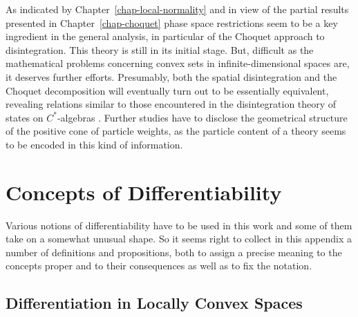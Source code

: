 \documentclass[11pt,twoside,openright]{report}
\theoremstyle{definition}
\theoremstyle{plain}
\theoremstyle{remark}
\theoremstyle{assumption}
\begin{document}
As indicated by Chapter~\ref{chap-local-normality} and in view of the
partial results presented in Chapter~\ref{chap-choquet} phase space
restrictions seem to be a key ingredient in the general analysis, in
particular of the Choquet approach to disintegration. This theory is
still in its initial stage. But, difficult as the mathematical
problems concerning convex sets in infinite-dimensional spaces are, it
deserves further efforts. Presumably, both the spatial disintegration
and the Choquet decomposition will eventually turn out to be
essentially equivalent, revealing relations similar to those
encountered in the disintegration theory of states on
$C^*$-algebras \cite[Chapter~4]{bratteli/robinson:1987}. Further
studies have to disclose the geometrical structure of the positive
cone of particle weights, as the particle content of a theory seems to
be encoded in this kind of information.



\appendix

\chapter{Concepts of Differentiability}
  \label{chap-differentiability}


Various notions of differentiability have to be used in this work and
some of them take on a somewhat unusual shape. So it seems right to
collect in this appendix a number of definitions and propositions,
both to assign a precise meaning to the concepts proper and to their
consequences as well as to fix the notation.


\section{Differentiation in Locally Convex Spaces}
\end{document}
